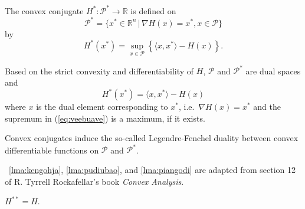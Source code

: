 \documentclass[12pt]{article}
\begin{document}
\begin{definition}
  \label{def:paegoozi}
  The convex conjugate
  $H^{\ast}:\mathcal{P}^{\ast}\rightarrow\mathbb{R}$ is defined on
\begin{equation}
  \label{eq:osaenise}
\mathcal{P}^{\ast}=\{x^{\ast}\in\mathbb{R}^{n}\,\vert\,\nabla{}H(x)=x^{\ast},x\in\mathcal{P}\}
\end{equation}
by
\begin{equation}
  \label{eq:veebuave}
  H^{\ast}(x^{\ast})=\sup_{x\in\mathcal{P}}\left\{\langle{}x,x^{\ast}\rangle-H(x)\right\}.
\end{equation}
\end{definition}

Based on the strict convexity and differentiability of $H$,
$\mathcal{P}$ and $\mathcal{P}^{\ast}$ are dual spaces and
\begin{equation}
  \label{eq:phavuugi}
  H^{\ast}(x^{\ast})=\langle{}x,x^{\ast}\rangle-H(x)
\end{equation}
where $x$ is the dual element corresponding to $x^{\ast}$, i.e.\
$\nabla{}H(x)=x^{\ast}$ and the supremum in (\ref{eq:veebuave}) is a
maximum, if it exists.

Convex conjugates induce the so-called Legendre-Fenchel duality
between convex differentiable functions on $\mathcal{P}$ and
$\mathcal{P}^{\ast}$. 


{\Emmas}~\ref{lma:kengohja}, \ref{lma:pudiubao}, and
\ref{lma:piangodi} are adapted from section 12 of R. Tyrrell
Rockafellar's book \emph{Convex Analysis}.

\begin{lemma}
  \label{lma:kengohja}
    $H^{\ast\ast}=H$.
\end{lemma}
\end{document}

